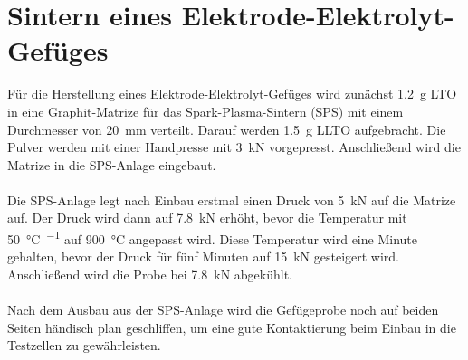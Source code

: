 \documentclass[a4paper, 11pt, headsepline,footsepline,twoside,abstract]{scrbook}
\begin{document}
\section{Sintern eines Elektrode-Elektrolyt-Gefüges}
Für die Herstellung eines Elektrode-Elektrolyt-Gefüges wird zunächst \SI{1.2}{\gram} LTO in eine Graphit-Matrize für das Spark-Plasma-Sintern (SPS) mit einem Durchmesser von \SI{20}{\milli\metre} verteilt. Darauf werden \SI{1.5}{\gram} LLTO aufgebracht. Die Pulver werden mit einer Handpresse mit \SI{3}{\kilo\newton} vorgepresst. Anschließend wird die Matrize in die SPS-Anlage eingebaut. 
\\\\
Die SPS-Anlage legt nach Einbau erstmal einen Druck von \SI{5}{\kilo\newton} auf die Matrize auf. Der Druck wird dann auf \SI{7.8}{\kilo\newton} erhöht, bevor die Temperatur mit \SI{50}{\celsius\per\min} auf \SI{900}{\celsius} angepasst wird. Diese Temperatur wird eine Minute gehalten, bevor der Druck für fünf Minuten auf \SI{15}{\kilo\newton} gesteigert wird. Anschließend wird die Probe bei \SI{7.8}{\kilo\newton} abgekühlt. 
\\\\
Nach dem Ausbau aus der SPS-Anlage wird die Gefügeprobe noch auf beiden Seiten händisch plan geschliffen, um eine gute Kontaktierung beim Einbau in die Testzellen zu gewährleisten.
\end{document}

